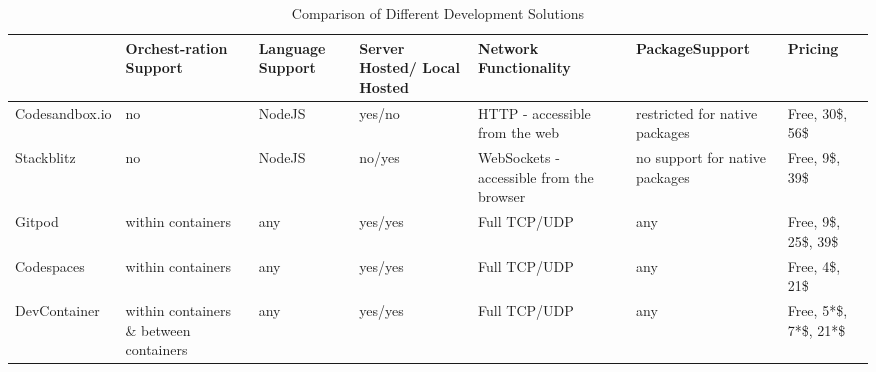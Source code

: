 
\begin{landscape}
\begin{table}[]
    \begin{tabular}{@{}lp{}p{}p{}p{}p{}p{}@{}}
    \toprule
                    & Orchest-ration Support                   & Language Support & Server Hosted/ Local Hosted & Network \newline Functionality                      & Package\newline Support                & Pricing             \\ \toprule
    \rowcolor[HTML]{9B9B9B} Codesandbox.io & no                                      & NodeJS           & yes/no                     & HTTP - accessible from the web             & restricted for native packages & Free, 30\$, 56\$      \\
    Stackblitz     & no                                      & NodeJS           & no/yes                     & WebSockets - accessible from the browser & no support for native packages & Free, 9\$, 39\$       \\
    \rowcolor[HTML]{9B9B9B} Gitpod         & within containers                     & any              & yes/yes                    & Full TCP/UDP                               & any                            & Free, 9\$, 25\$, 39\$ \\
    Codespaces     & within containers                     & any              & yes/yes                    & Full TCP/UDP                               & any                            & Free, 4\$, 21\$       \\
    \rowcolor[HTML]{9B9B9B} DevContainer   & within containers \& between containers  & any              & yes/yes                    & Full TCP/UDP                               & any                            & Free, 5*\$, 7*\$, 21*\$               \\
    \end{tabular}%
    \caption{Comparison of Different Development Solutions}\label{tab::env_compare}
\end{table}
\end{landscape}


